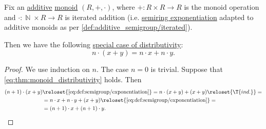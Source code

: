 \begin{proposition}\label{thm:monoid_distributivity}
  Fix an \hyperref[def:additive_semigroup/iterated]{additive} \hyperref[def:monoid]{monoid} \( (R, +, \cdot) \), where \( +: R \times R \to R \) is the monoid operation and \( \cdot: \BbbN \times R \to R \) is iterated addition (i.e. \hyperref[def:semiring/exponentiation]{semiring exponentiation} adapted to additive monoids as per \cref{def:additive_semigroup/iterated}).

  Then we have the following \hyperref[def:semiring/theory/axioms/distributivity]{special case of distributivity}:
  \begin{equation}\label{eq:thm:monoid_distributivity}
    n \cdot (x + y) = n \cdot x + n \cdot y.
  \end{equation}
\end{proposition}
\begin{proof}
  We use induction on \( n \). The case \( n = 0 \) is trivial. Suppose that \eqref{eq:thm:monoid_distributivity} holds. Then
  \begin{align*}
    (n + 1) \cdot (x + y)
    &\reloset {\eqref{eq:def:semigroup/exponentiation}} =
    n \cdot (x + y) + (x + y)
    \reloset {\T{ind.}} = \\ &=
    n \cdot x + n \cdot y + (x + y)
    \reloset {\eqref{eq:def:semigroup/exponentiation}} = \\ &=
    (n + 1) \cdot x + (n + 1) \cdot y.
  \end{align*}
\end{proof}


